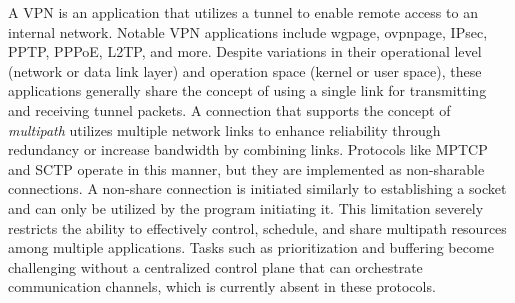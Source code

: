 A \ac{VPN} is an application that utilizes a tunnel to enable remote access to an internal network. 
Notable \ac{VPN} applications include \ac{wgpage}, \ac{ovpnpage}, IPsec, PPTP, PPPoE, L2TP, and more. 
Despite variations in their operational level (network or data link layer) and operation space (kernel or user space), these applications generally share the concept of using a single link for transmitting and receiving tunnel packets.
A connection that supports the concept of \textit{multipath} utilizes multiple network links to enhance reliability through redundancy or increase bandwidth by combining links. 
Protocols like \ac{MPTCP} and \ac{SCTP} operate in this manner, but they are implemented as non-sharable connections.
A non-share connection is initiated similarly to establishing a socket and can only be utilized by the program initiating it. This limitation severely restricts the ability to effectively control, schedule, and share multipath resources among multiple applications. 
Tasks such as prioritization and buffering become challenging without a centralized control plane that can orchestrate communication channels, which is currently absent in these protocols.

